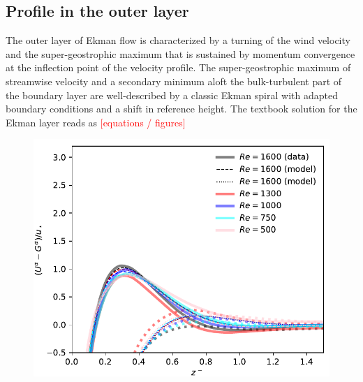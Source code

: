 \documentclass[a4paper,11pt]{amsart}
\newcommand{\todo}[1]{\textcolor{red}{$[$#1$]$}}
\begin{document}
\subsection{Profile in the outer layer}
%
The outer layer of Ekman flow is characterized by a turning of the wind velocity and the super-geostrophic maximum
that is sustained by momentum convergence at the inflection point of the velocity profile. 
The super-geostrophic maximum of streamwise velocity and a secondary minimum aloft the bulk-turbulent part of
the boundary layer are well-described by a classic Ekman spiral with adapted boundary conditions and a shift
in reference height.
%
The textbook solution for the Ekman layer reads as 
\todo{equations / figures}
\begin{figure}
  \includegraphics[width=\textwidth]{../plot/outer_layer.pdf}
  \caption{} 
\end{figure}
\end{document}
